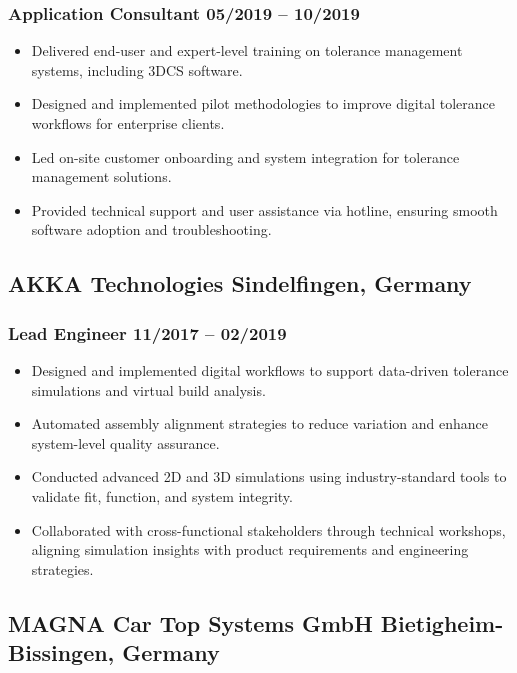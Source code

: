 \documentclass[11pt]{article} %
\begin{document}
	\subsubsection{Application Consultant \hfill 05/2019 – 10/2019}
	\begin{itemize}[itemsep=4pt, topsep=2pt, left=1em]
		\item Delivered end-user and expert-level training on tolerance management systems, including 3DCS software.
		\item Designed and implemented pilot methodologies to improve digital tolerance workflows for enterprise clients.
		\item Led on-site customer onboarding and system integration for tolerance management solutions.
		\item Provided technical support and user assistance via hotline, ensuring smooth software adoption and troubleshooting.  
	\end{itemize}
	
	\subsection{AKKA Technologies \hfill Sindelfingen, Germany}
	\subsubsection{Lead Engineer \hfill 11/2017 – 02/2019}
	\begin{itemize}[itemsep=4pt, topsep=2pt, left=1em]
		\item Designed and implemented digital workflows to support data-driven tolerance simulations and virtual build analysis.
		\item Automated assembly alignment strategies to reduce variation and enhance system-level quality assurance.
		\item Conducted advanced 2D and 3D simulations using industry-standard tools to validate fit, function, and system integrity.
		\item Collaborated with cross-functional stakeholders through technical workshops, aligning simulation insights with product requirements and engineering strategies.
	\end{itemize}
	
	\subsection{MAGNA Car Top Systems GmbH \hfill Bietigheim-Bissingen, Germany}
\end{document}
